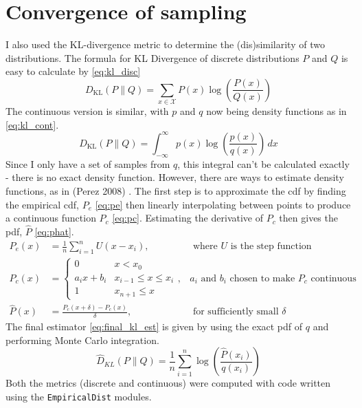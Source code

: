 \section{Convergence of sampling}
I also used the KL-divergence metric to determine the (dis)similarity of two distributions. The formula for KL Divergence of discrete distributions $P$ and $Q$ is easy to calculate by \eqref{eq:kl_disc}
% 
\begin{equation} \label{eq:kl_disc}
	{D_{\text{KL}}(P\parallel Q)=\sum _{x\in {\mathcal {X}}}P(x)\log \left({\frac {P(x)}{Q(x)}}\right)} 
\end{equation} 
% 
The continuous version is similar, with $p$ and $q$ now being density functions as in \eqref{eq:kl_cont}. 
% 
\begin{equation} \label{eq:kl_cont}	
	{D_\text{KL}}(P\parallel Q)=\int _{-\infty }^{\infty }p(x)\log \left({\frac {p(x)}{q(x)}}\right)\,dx
\end{equation} 
% 
Since I only have a set of samples from $q$, this integral can't be calculated exactly - there is no exact density function. However, there are ways to estimate density functions, as in (Perez 2008) \cite{perez2008kullback}. The first step is to approximate the cdf by finding the empirical cdf, $P_e$ \eqref{eq:pe} then linearly interpolating between points to produce a continuous function $P_c$ \eqref{eq:pc}. Estimating the derivative of $P_c$ then gives the pdf, $\hat{P}$ \eqref{eq:phat}. 
% 
\begin{align}
	P_e(x)     & = \frac1{n}\sum_{i=1}^n U(x-x_i) ,        & \text{ where $U$ is the step function}\label{eq:pe}    \\ 
	P_c(x)     & = \begin{cases}                                                                                
	0          & x<x_0                                                                                          \\
	a_ix+b_i   & x_{i-1} \leq x \le x_i                                                                         \\
	1          & x_{n+1} \leq x                                                                                 
	\end{cases} \label{eq:pc} ,& \text{$a_i$ and $b_i$ chosen to make $P_c$ continuous }\\ 
	\hat{P}(x) & = \frac{P_c(x+\delta) - P_c(x)}{\delta} , & \text{ for sufficiently small }\delta  \label{eq:phat} 
\end{align}
% 
The final estimator \eqref{eq:final_kl_est} is given by using the exact pdf of $q$ and performing Monte Carlo integration.
% 
\begin{equation}
	\label{eq:final_kl_est}
	\hat{D}_{KL}(P \| Q) = \frac1{n}\sum_{i=1}^n \log\left(\frac{\hat{P}(x_i)}{q(x_i)}\right) 
\end{equation}
% 
Both the metrics (discrete and continuous) were computed with code written using the \texttt{EmpiricalDist} modules.


